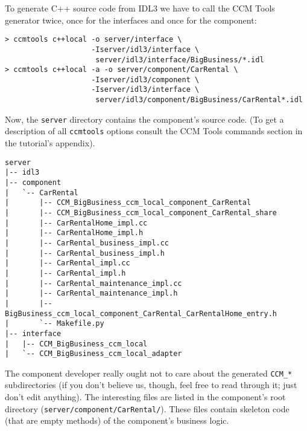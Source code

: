 To generate C++ source code from IDL3 we have to call the CCM Tools generator
twice, once for the interfaces and once for the component:
\begin{small}
\begin{verbatim}
> ccmtools c++local -o server/interface \
                    -Iserver/idl3/interface \
                     server/idl3/interface/BigBusiness/*.idl
> ccmtools c++local -a -o server/component/CarRental \
                    -Iserver/idl3/component \
                    -Iserver/idl3/interface \
                     server/idl3/component/BigBusiness/CarRental*.idl 
\end{verbatim}
\end{small}

Now, the {\tt server} directory contains the component's source code. 
(To get a description of all {\tt ccmtools} options consult the 
CCM Tools commands section in the tutorial's appendix).
\begin{small}
\begin{verbatim}
server
|-- idl3
|-- component
|   `-- CarRental
|       |-- CCM_BigBusiness_ccm_local_component_CarRental
|       |-- CCM_BigBusiness_ccm_local_component_CarRental_share
|       |-- CarRentalHome_impl.cc
|       |-- CarRentalHome_impl.h
|       |-- CarRental_business_impl.cc
|       |-- CarRental_business_impl.h
|       |-- CarRental_impl.cc
|       |-- CarRental_impl.h
|       |-- CarRental_maintenance_impl.cc
|       |-- CarRental_maintenance_impl.h
|       |-- BigBusiness_ccm_local_component_CarRental_CarRentalHome_entry.h
|       `-- Makefile.py
|-- interface
|   |-- CCM_BigBusiness_ccm_local
|   `-- CCM_BigBusiness_ccm_local_adapter
\end{verbatim}
\end{small}

The component developer really ought not to care about the generated 
{\tt CCM\_*} subdirectories (if you don't believe us, though, feel free 
to read through it; just don't edit anything). 
The interesting files are listed in the component's root directory 
({\tt server/component/CarRental/}). 
These files contain skeleton code (that are empty methods) of the component's 
business logic.

